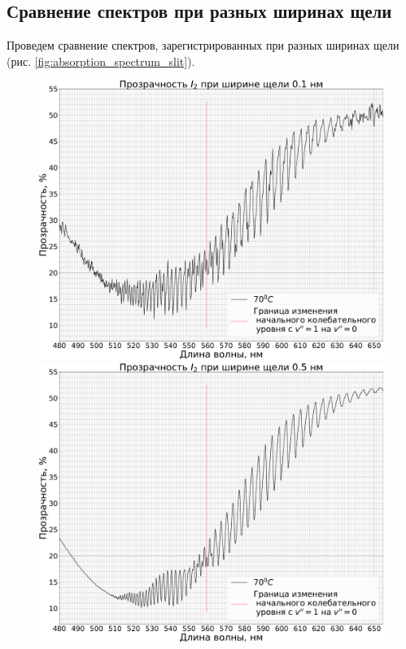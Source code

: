 \subsection{Сравнение спектров при разных ширинах щели}
Проведем сравнение спектров, зарегистрированных при разных ширинах щели (рис. \ref{fig:absorption_spectrum_slit}).
\begin{figure}[H]
	\begin{minipage}[h]{0.5\linewidth}
		\centering
		\includegraphics[width=1\linewidth]{data/absorption_spectrum_slit_01}
	\end{minipage}
	\begin{minipage}[h!]{0.5\linewidth}
		\centering
		\includegraphics[width=1\linewidth]{data/absorption_spectrum_slit_05}

\end{minipage}
\end{figure}
